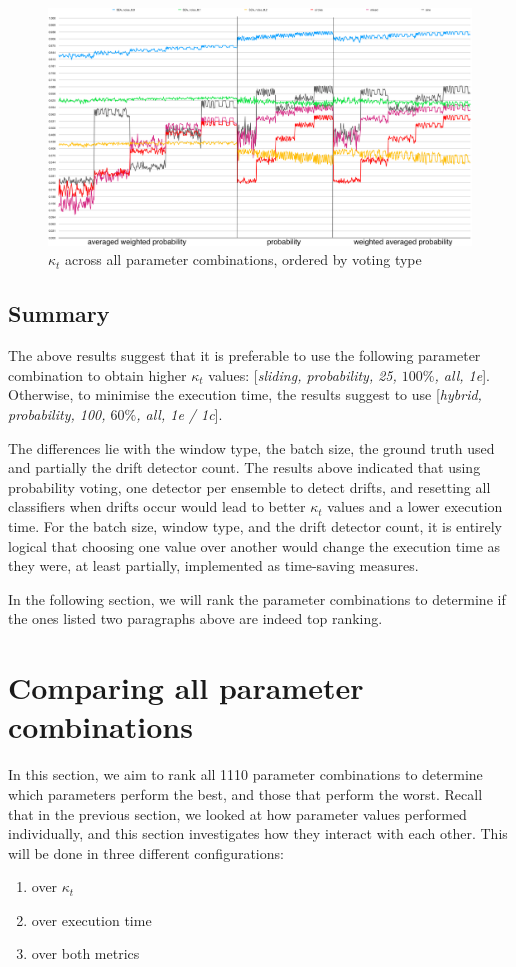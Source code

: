 \begin{figure}
  \includegraphics[width=\linewidth]{./images/chapter5/raw_voting_type}
\caption{\label{fig:order_by_voting_type}$\kappa_t$ across all parameter combinations, ordered by voting type}
\end{figure}

\subsection{Summary}
The above results suggest that it is preferable to use the following parameter combination to obtain higher $\kappa_t$ values: [\textit{sliding, probability, 25, $100\%$, all, 1e}].
Otherwise, to minimise the execution time, the results suggest to use [\textit{hybrid, probability, 100, $60\%$, all, 1e / 1c}].

The differences lie with the window type, the batch size, the ground truth used and partially the drift detector count. The results above indicated that using probability voting, one detector per ensemble to detect drifts, and resetting all classifiers when drifts occur would lead to better $\kappa_t$ values and a lower execution time. For the batch size, window type, and the drift detector count, it is entirely logical that choosing one value over another would change the execution time as they were, at least partially, implemented as time-saving measures.

In the following section, we will rank the parameter combinations to determine if the ones listed two paragraphs above are indeed top ranking.

\section{Comparing all parameter combinations}
In this section, we aim to rank all 1110 parameter combinations to determine which parameters perform the best, and those that perform the worst.  Recall that in the previous section, we looked at how parameter values performed individually, and this section investigates how they interact with each other. This will be done in three different configurations:
\begin{enumerate}
\item over $\kappa_t$
\item over execution time
\item over both metrics
\end{enumerate}

